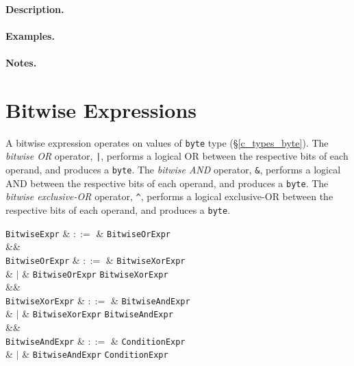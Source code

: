 \paragraph{Description.}

\paragraph{Examples.}

\paragraph{Notes.} 


\section{Bitwise Expressions}
\label{c_expr_bitwise}
A bitwise expression operates on values of \lstinline{byte} type (\S\ref{c_types_byte}).  The {\em bitwise OR} operator, \lstinline{|}, performs a logical OR between the respective bits of each operand, and produces a \lstinline{byte}.  The {\em bitwise AND} operator, \lstinline{&}, performs a logical AND between the respective bits of each operand, and produces a \lstinline{byte}.   The {\em bitwise exclusive-OR} operator, \lstinline{^}, performs a logical exclusive-OR between the respective bits of each operand, and produces a \lstinline{byte}.

\begin{syntax}
  \verb+BitwiseExpr+ & $::=$ & \verb+BitwiseOrExpr+ \\
  &&\\
  \verb+BitwiseOrExpr+ & $::=$ & \verb+BitwiseXorExpr+ \\
                           & $|$ & \verb+BitwiseOrExpr+ \token{|} \verb+BitwiseXorExpr+\\
  &&\\
  \verb+BitwiseXorExpr+ & $::=$ & \verb+BitwiseAndExpr+ \\
                            & $|$ & \verb+BitwiseXorExpr+ \token{\^} \verb+BitwiseAndExpr+\\
  &&\\
  \verb+BitwiseAndExpr+ & $::=$ & \verb+ConditionExpr+ \\
                            & $|$ & \verb+BitwiseAndExpr+ \token{\&\&} \verb+ConditionExpr+\\

\end{syntax}

